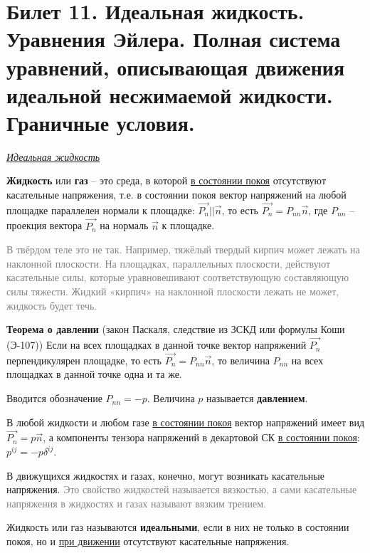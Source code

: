 \newpage
\section{Билет 11. Идеальная жидкость. Уравнения Эйлера. Полная система уравнений, описывающая движения идеальной несжимаемой жидкости. Граничные условия.}

\begin{center} \textit{\underline{Идеальная жидкость}} \end{center}

\begin{defn}[]\textbf{Жидкость} или \textbf{газ} -- это среда, в которой \underline{в состоянии покоя} отсутствуют касательные напряжения, т.е. в состоянии покоя вектор напряжений на любой площадке параллелен нормали к площадке: $ \vec{P_n} || \vec{n} $, то есть $ \vec{P_n} = P_{nn} \vec{n} $, где $ P_{nn} $ -- проекция вектора $ \vec{P_n} $ на нормаль $ \vec{n} $ к площадке.
\end{defn}

\textcolor{gray}{В твёрдом теле это не так. Например, тяжёлый твердый кирпич может лежать на наклонной плоскости. На площадках, параллельных плоскости, действуют касательные силы, которые уравновешивают соответствующую составляющую силы тяжести. Жидкий «кирпич» на наклонной плоскости лежать не может, жидкость будет течь.} 

\begin{theorem}[Э-124] \textbf{Теорема о давлении} (закон Паскаля, следствие из ЗСКД или формулы Коши (Э-107))
Если на всех площадках в данной точке вектор напряжений $ \vec{P_n} $ перпендикулярен площадке, то есть $ \vec{P_n} = P_{nn} \vec{n} $, то величина $ P_{nn} $ на всех площадках в данной точке одна и та же. 
\end{theorem}

Вводится обозначение $P_{nn} = -p$. Величина $p$ называется \textbf{давлением}.

В любой жидкости и любом газе \underline{в состоянии покоя} вектор напряжений имеет вид $ \vec{P_n} = p \vec{n} $, а компоненты тензора напряжений в декартовой СК \underline{в состоянии покоя}: $ p^{ij} = -p \delta^{ij} $.

В движущихся жидкостях и газах, конечно, могут возникать касательные напряжения.
\textcolor{gray}{Это свойство жидкостей называется вязкостью, а сами касательные напряжения в жидкостях и газах называют вязким трением.}

\begin{defn}[Э-125] Жидкость или газ называются \textbf{идеальными}, если в них не только в состоянии покоя, но и \underline{при движении} отсутствуют касательные напряжения.
\end{defn}

